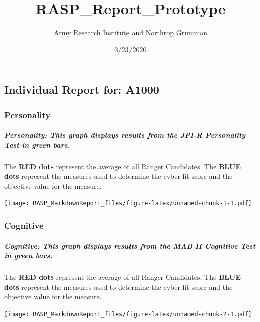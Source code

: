 \documentclass[]{article}
\title{RASP\_Report\_Prototype}
\author{Army Research Institute and Northrop Grumman}
\date{3/23/2020}
\let\oldsubparagraph\subparagraph
\renewcommand{\subparagraph}[1]{\oldsubparagraph{#1}\mbox{}}
\begin{document}
\maketitle

\hypertarget{individual-report-for-a1000}{%
\subsection{Individual Report for:
A1000}\label{individual-report-for-a1000}}

\hypertarget{personality}{%
\subsubsection{Personality}\label{personality}}

\hypertarget{personality-this-graph-displays-results-from-the-jpi-r-personality-test-in-green-bars.}{%
\subparagraph{\texorpdfstring{Personality: This graph displays results
from the JPI-R Personality Test in \textbf{green
bars}.}{Personality: This graph displays results from the JPI-R Personality Test in green bars.}}\label{personality-this-graph-displays-results-from-the-jpi-r-personality-test-in-green-bars.}}

The \textbf{RED dots} represent the average of all Ranger Candidates.
The \textbf{BLUE dots} represent the measures used to determine the
cyber fit score and the objective value for the measure.

\texttt{[image: RASP\_MarkdownReport\_files/figure-latex/unnamed-chunk-1-1.pdf]}

\hypertarget{cognitive}{%
\subsubsection{Cognitive}\label{cognitive}}

\hypertarget{cognitive-this-graph-displays-results-from-the-mab-ii-cognitive-test-in-green-bars.}{%
\subparagraph{\texorpdfstring{Cognitive: This graph displays results
from the MAB II Cognitive Test in \textbf{green
bars}.}{Cognitive: This graph displays results from the MAB II Cognitive Test in green bars.}}\label{cognitive-this-graph-displays-results-from-the-mab-ii-cognitive-test-in-green-bars.}}

The \textbf{RED dots} represent the average of all Ranger Candidates.
The \textbf{BLUE dots} represent the measures used to determine the
cyber fit score and the objective value for the measure.

\texttt{[image: RASP\_MarkdownReport\_files/figure-latex/unnamed-chunk-2-1.pdf]}
\end{document}
